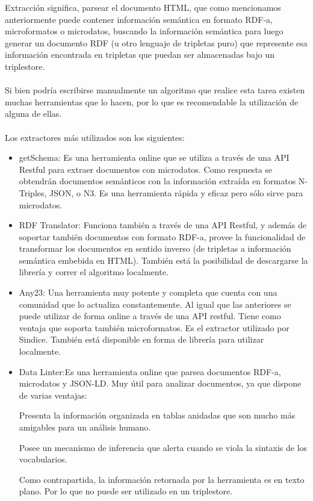 Extracción significa, parsear el documento HTML, que como mencionamos anteriormente puede contener información semántica en formato RDF-a, microformatos o microdatos, buscando 
la información semántica para luego generar un documento RDF (u otro lenguaje de tripletas puro) que represente esa información encontrada en tripletas que puedan ser almacenadas bajo un triplestore.
\\\\
Si bien podría escribirse manualmente un algoritmo que realice esta tarea existen muchas herramientas que lo hacen, por lo que es recomendable la utilización de alguna de ellas.
\\\\
Los extractores más utilizados son los siguientes:
\begin{itemize}
\item getSchema: Es una herramienta online que se utiliza a través de una API Restful para extraer documentos con microdatos. Como respuesta se obtendrán documentos semánticos 
con la información extraída en formatos N-Triples, JSON, o N3. 
Es una herramienta rápida y eficaz pero sólo sirve para microdatos.

\item RDF Translator: Funciona también a través de una API Restful, y además de soportar también documentos con formato RDF-a, provee la funcionalidad de transformar los documentos en sentido inverso 
(de tripletas a información semántica embebida en HTML). 
También está la posibilidad de descargarse la librería y correr el algoritmo localmente.

\item Any23: Una herramienta muy potente y completa que cuenta con una comunidad que lo actualiza constantemente. Al igual que las anteriores se puede utilizar de forma online a través 
de una API restful. Tiene como ventaja que soporta también microformatos. Es el extractor utilizado por Sindice. 
También está disponible en forma de librería para utilizar localmente.

\item Data Linter:Es una herramienta online que parsea documentos RDF-a, microdatos y JSON-LD.  
Muy útil para analizar documentos, ya que dispone de varias ventajas: 

Presenta la información organizada en tablas anidadas que son mucho más amigables para un análisis humano. 

Posee un mecanismo de inferencia que alerta cuando se viola la sintaxis de los vocabularios.

Como contrapartida, la información retornada por la herramienta es en texto plano. Por lo que no puede ser utilizado en un triplestore.

\end{itemize}

